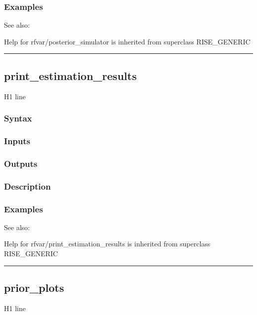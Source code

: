 \documentclass[letterpaper,10pt,english]{sphinxmanual}
\begin{document}
\subsubsection{Examples}
\label{classes/models/@rfvar/rfvar:id89}
See also:

Help for rfvar/posterior\_simulator is inherited from superclass RISE\_GENERIC


\bigskip\hrule{}\bigskip



\subsection{print\_estimation\_results}
\label{classes/models/@rfvar/rfvar:id90}\label{classes/models/@rfvar/rfvar:print-estimation-results}
H1 line


\subsubsection{Syntax}
\label{classes/models/@rfvar/rfvar:id91}

\subsubsection{Inputs}
\label{classes/models/@rfvar/rfvar:id92}

\subsubsection{Outputs}
\label{classes/models/@rfvar/rfvar:id93}

\subsubsection{Description}
\label{classes/models/@rfvar/rfvar:id94}

\subsubsection{Examples}
\label{classes/models/@rfvar/rfvar:id95}
See also:

Help for rfvar/print\_estimation\_results is inherited from superclass RISE\_GENERIC


\bigskip\hrule{}\bigskip



\subsection{prior\_plots}
\label{classes/models/@rfvar/rfvar:prior-plots}\label{classes/models/@rfvar/rfvar:id96}
H1 line
\end{document}
